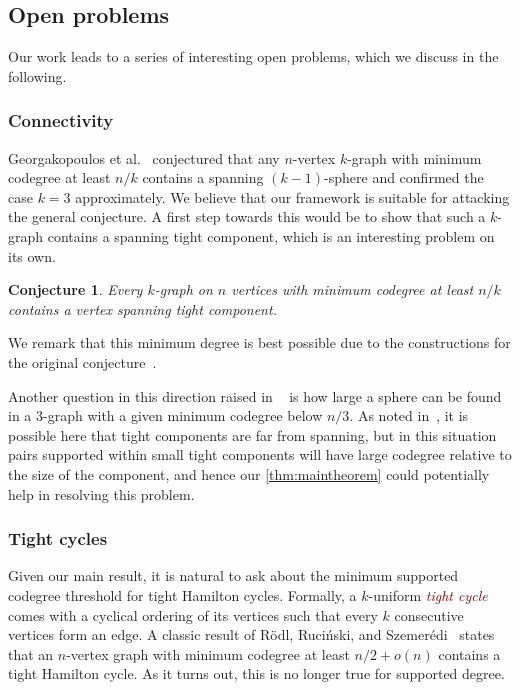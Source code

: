 \documentclass[12pt,reqno]{amsart}
\theoremstyle{plain}
\newtheorem{conjecture}[theorem]{Conjecture}
\theoremstyle{definition}
\numberwithin{equation}{section}
\newcommand{\defn}[1]{\textcolor{Maroon}{\emph{#1}}}
\begin{document}
	
	
	\subsection{Open problems}\label{sec:open-problems}
	
	Our work leads to a series of interesting open problems, which we discuss in the following.
	
	\subsubsection*{Connectivity}
	
	Georgakopoulos et al.~\cite{georgakopoulos2022spanning} conjectured that any $n$-vertex $k$-graph with minimum codegree at least $n/k$ contains a spanning $(k - 1)$-sphere and confirmed the case $k=3$ approximately.
	We believe that our framework is suitable for attacking the general conjecture.
	A first step towards this would be to show that such a $k$-graph contains a spanning tight component, which is an interesting problem on its own.
	
	\begin{conjecture}
		Every $k$-graph on $n$ vertices with minimum codegree at least  $n/k$ contains a vertex spanning tight component.
	\end{conjecture}
	
	We remark that this minimum degree is best possible due to the constructions for the original conjecture~\cite{georgakopoulos2022spanning}.
	
	Another question in this direction raised in ~\cite{georgakopoulos2022spanning} is how large a sphere can be found in a $3$-graph with a given minimum codegree below $n/3$. As noted in~\cite{georgakopoulos2022spanning}, it is possible here that tight components are far from spanning, but in this situation pairs supported within small tight components will have large codegree relative to the size of the component, and hence our \cref{thm:maintheorem} could potentially help in resolving this problem.
	
	
	\subsubsection*{Tight cycles}
	
	Given our main result, it is natural to ask about the minimum supported codegree threshold for tight Hamilton cycles.
	Formally, a $k$-uniform \defn{tight cycle} comes with a cyclical ordering of its vertices such that every $k$ consecutive vertices form an edge.
	A classic result of R\"{o}dl, Ruci\'{n}ski, and Szemer\'{e}di~\cite{RRS08a} states that an $n$-vertex graph with minimum codegree at least $n/2 + o(n)$ contains a tight Hamilton cycle.
	As it turns out, this is no longer true for supported degree.
	
\end{document}
